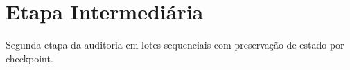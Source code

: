\section{Etapa Intermediária}
Segunda etapa da auditoria em lotes sequenciais com preservação de estado por checkpoint.
